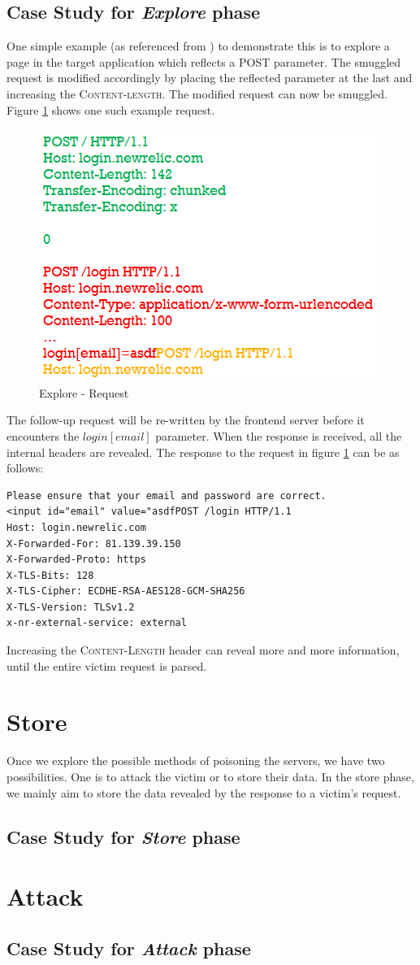 \subsection{Case Study for \textit{Explore} phase}
One simple example (as referenced from \cite{b6}) to demonstrate this is to explore a page in the target application which reflects a POST parameter. The smuggled request is modified accordingly by placing the reflected parameter at the last and increasing the \textsc{Content-length}. The modified request can now be smuggled. Figure \ref{fig:Explore_Request} shows one such example request.\\ 
\begin{figure}
	\includegraphics{images/Explore_Request}
	\caption{Explore - Request}
	\label{fig:Explore_Request}
\end{figure}
The follow-up request will be re-written by the frontend server before it encounters the $login[email]$ parameter. When the response is received, all the internal headers are revealed. 
The response to the request in figure \ref{fig:Explore_Request} can be as follows:
\begin{verbatim}
Please ensure that your email and password are correct.
<input id="email" value="asdfPOST /login HTTP/1.1
Host: login.newrelic.com
X-Forwarded-For: 81.139.39.150
X-Forwarded-Proto: https
X-TLS-Bits: 128
X-TLS-Cipher: ECDHE-RSA-AES128-GCM-SHA256
X-TLS-Version: TLSv1.2
x-nr-external-service: external
\end{verbatim}
Increasing the \textsc{Content-Length} header can reveal more and more information, until the entire victim request is parsed. 

\section{Store}
Once we explore the possible methods of poisoning the servers, we have two possibilities. One is to attack the victim or to store their data. In the store phase, we mainly aim to store the data revealed by the response to a victim's request. 
\subsection{Case Study for \textit{Store} phase}


\section{Attack}
\subsection{Case Study for \textit{Attack} phase}